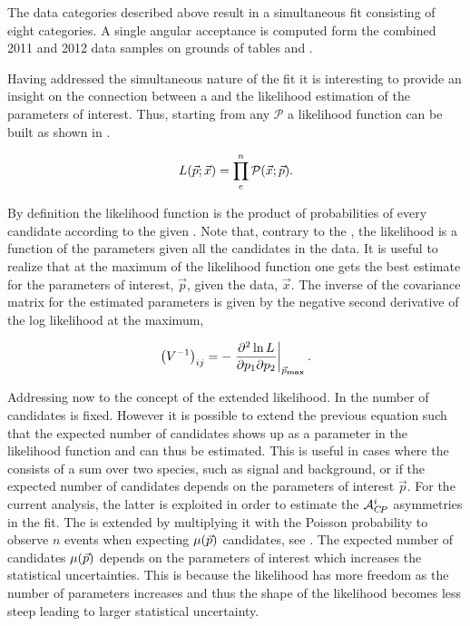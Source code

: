 The data categories described above result in a simultaneous fit consisting of eight categories.
A single angular acceptance is computed form the combined 2011 and 2012 data samples on grounds of
tables  and .

Having addressed the simultaneous nature of the fit it is interesting to provide an insight on
the connection between a \pdf and the likelihood estimation of the parameters of interest. Thus, starting from
any \pdf $\mathcal{P}$ a likelihood function can be built as shown in .

\begin{equation}
  \centering
L(\vec{p};\vec{x}) = \prod_e^n \mathcal{P}(\vec{x};\vec{p}).
\label{likelihood}
\end{equation}

\noindent By definition the likelihood function is the product of probabilities of every candidate according to the
 given \pdf. Note that, contrary to the \pdf, the likelihood is a function of the parameters given all the candidates in the data.
It is useful to realize that at the maximum of the likelihood function one gets the best estimate for the parameters of
interest, $\vec{p}$, given the data, $\vec{x}$. The inverse of the covariance matrix for the estimated parameters is given
by the negative second derivative of the log likelihood at the maximum,

\begin{equation}
  \centering
\left( V^{-1} \right)_{ij} = - \left. \frac{\partial^2\ln L}{\partial p_1 \partial p_2} \right|_{ \vec{p}_{\rm\bf max}}.
\label{covariance}
\end{equation}

Addressing now to the concept of the extended likelihood. In  the number of candidates is fixed.
However it is possible to extend the previous equation such that the expected number of candidates shows up as a parameter in the likelihood
function and can thus be estimated. This is useful in cases where the \pdf consists of a sum over two species, such as signal and background,
or if the expected number of candidates depends on the parameters of interest $\vec{p}$. For the current analysis, the latter is
exploited in order to estimate the $\mathcal{A}_{C\!P}^{i}$ asymmetries in the fit. The \pdf is extended by multiplying it with the Poisson
probability to observe $n$ events when expecting $\mu({\vec{p}}) $ candidates, see . 
The expected number of candidates $\mu({\vec{p}}) $ depends on the
parameters of interest which increases the statistical uncertainties. This is because the likelihood has more freedom
as the number of parameters increases and thus the shape of the likelihood becomes less steep leading to larger statistical
uncertainty.

